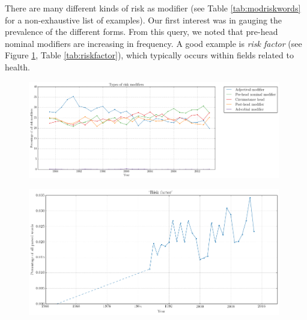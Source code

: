     There are many different kinds of risk as modifier (see Table \ref{tab:modriskwords} for a non-exhaustive list of examples). Our first interest was in gauging the prevalence of the different forms. From this query, we noted that pre-head nominal modifiers are increasing in frequency. A good example is \emph{risk factor} (see Figure \ref{fig:riskfactor}, Table \ref{tab:riskfactor}), which typically occurs within fields related to health.

    \noindent
    \begin{figure}[htb!]
    \centering
    \begin{minipage}{.567\textwidth}
    \centering
    \includegraphics[width=0.98\textwidth]{../images/old-types-of-risk-modifiers.png}
    \label{fig:riskmod_types}
    \end{minipage}%
    \begin{minipage}{.433\textwidth}
    \centering
    \includegraphics[width=0.98\textwidth]{../images/risk-factor.png}
    \label{fig:riskfactor}
    \end{minipage}
    \end{figure}

